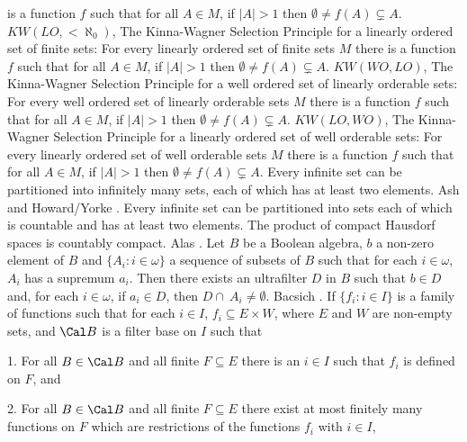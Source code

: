 is a function $f$ such that for all $A\in M$, if $|A|>1$ then
$\emptyset\neq f(A)\subsetneq A$.
\medskip
{} $KW(LO,<\aleph_0)$, The Kinna-Wagner Selection
Principle for a linearly ordered set of finite sets: For every linearly
ordered set of finite sets $M$ there is a function $f$ such that for all
$A\in M$, if $|A|>1$ then $\emptyset\neq f(A)\subsetneq A$.
\medskip
{} $KW(WO,LO)$, The Kinna-Wagner Selection
Principle for a well ordered set of linearly orderable sets:
For every well ordered set of linearly orderable sets $M$ there
is a function $f$ such that for all $A\in M$, if $|A|>1$ then
$\emptyset\neq f(A)\subsetneq A$.
\medskip
{} $KW(LO,WO)$, The Kinna-Wagner Selection
Principle for a linearly ordered set of well orderable sets:
For every linearly ordered set of well orderable sets $M$ there
is a function $f$ such that for all $A\in M$, if $|A|>1$ then
$\emptyset\neq f(A)\subsetneq A$.
\medskip
{} Every infinite set can be partitioned into
infinitely many sets, each of which has at least two elements. \ac{Ash}
\cite{1983} and \ac{Howard/Yorke} \cite{1989}.
\medskip
{} Every infinite set can be partitioned into sets
each of which is countable and has at least two elements.
\medskip
{} The product of compact Hausdorf spaces is
countably compact. \ac{Alas} \cite{1994}.
\medskip
{}  Let $B$ be a Boolean algebra, $b$ a non-zero
element of $B$ and $\{A_i: i\in\omega\}$ a sequence of subsets of $B$
such that for each $i\in\omega$, $A_i$ has a supremum $a_i$. Then there
exists an ultrafilter $D$ in $B$ such that $b\in D$ and, for each
$i\in\omega$, if $a_i\in D$, then $D\cap\ A_i\neq\emptyset$.
\ac{Bacsich} \cite{1972b}.
\medskip
{} If $\{f_i: i\in I\}$ is a family of functions
such that for each $i\in I$, $f_i\subseteq E\times W$, where $E$ and
$W$ are non-empty sets, and $\Cal B$ is a filter base on $I$ such that
\item {1.} For all $B\in\Cal B$ and all finite $F\subseteq E$ there
is an $i\in I$ such that $f_i$ is defined on $F$, and
\item {2.} For all $B \in\Cal B$ and all finite $F\subseteq E$ there
exist at most finitely many functions on $F$ which are restrictions
of the functions $f_i$ with $i\in I$,

